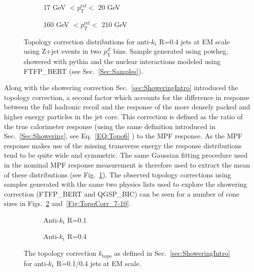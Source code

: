 \begin{figure}[!ht]
  \centering
  \begin{subfigure}{.5\textwidth}
    \centering
    \caption{17 GeV $< p_{\mathrm{T}}^{\mathrm{ref}} < $ 20 GeV}
  \end{subfigure}%
  \begin{subfigure}{.5\textwidth}  \centering
    \caption{160 GeV $< p_{\mathrm{T}}^{\mathrm{ref}} < $ 210 GeV}
  \end{subfigure}
 \caption[Example topology correction distributions]
 {\small Topology correction distributions for anti-$k_{\mathrm t}$ R=0.4 jets at EM scale using Z+jet events in two $p_{\mathrm T}^Z$ bins.  Sample generated using {\sc powheg}, showered with {\sc pythia} and the nuclear interactions modeled using FTFP\_BERT (see Sec.~\ref{Sec:Samples}).   }
 \label{Fig:TopologyDistExample}
\end{figure}

Along with the showering correction Sec.~\ref{sec:ShoweringIntro} introduced the topology correction, a second factor which accounts for the difference in response between the full hadronic recoil and the response of the more densely packed and higher energy particles in the jet core.  
This correction is defined as the ratio of the true calorimeter response (using the same definition introduced in Sec.~\ref{Sec:Showering}, see Eq.~\ref{EQ:Topo6} ) to the MPF response.  
As the MPF response makes use of the missing transverse energy the response distributions tend to be quite wide and symmetric.  
The same Gaussian fitting procedure used in the nominal MPF response measurement is therefore used to extract the mean of these distributions (see Fig.~\ref{Fig:TopologyDistExample}).  
The observed topology corrections using samples generated with the same two physics lists used to explore the showering correction (FTFP\_BERT and QGSP\_BIC) can be seen for a number of cone sizes in Figs.~\ref{Fig:TopoCorr_1-4} and~\ref{Fig:TopoCorr_7-10}.  

\begin{figure}[!ht]
  \centering
  \begin{subfigure}{.5\textwidth}
    \centering
    \caption{Anti-$k_\mathrm{t}$ R=0.1}
  \end{subfigure}%
  \begin{subfigure}{.5\textwidth}  \centering
    \caption{Anti-$k_\mathrm{t}$ R=0.4}
  \end{subfigure}
  \caption[Topology correction using anti-$k_\mathrm{t}$ R=0.1/0.4 jets]
{\small The topology correction $k_{\mathrm {topo}}$ as defined in Sec.~\ref{sec:ShoweringIntro} for anti-$k_\mathrm{t}$ R=0.1/0.4 jets at EM scale.  }
  \label{Fig:TopoCorr_1-4}
\end{figure}

